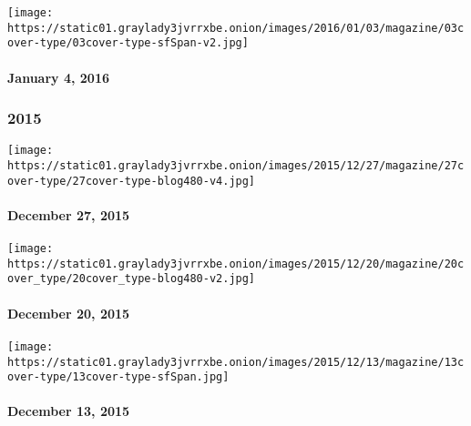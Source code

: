 \href{http://www.nytimes3xbfgragh.onion/indexes/2016/01/04/magazine/index.html}{}

\texttt{[image: https://static01.graylady3jvrrxbe.onion/images/2016/01/03/magazine/03cover-type/03cover-type-sfSpan-v2.jpg]}

\hypertarget{january-4-2016}{%
\paragraph{January 4, 2016}\label{january-4-2016}}

\hypertarget{2015}{%
\subsubsection{2015}\label{2015}}

\href{http://www.nytimes3xbfgragh.onion/indexes/2015/12/27/magazine/index.html}{}

\texttt{[image: https://static01.graylady3jvrrxbe.onion/images/2015/12/27/magazine/27cover-type/27cover-type-blog480-v4.jpg]}

\hypertarget{december-27-2015}{%
\paragraph{December 27, 2015}\label{december-27-2015}}

\href{http://www.nytimes3xbfgragh.onion/indexes/2015/12/20/magazine/index.html}{}

\texttt{[image: https://static01.graylady3jvrrxbe.onion/images/2015/12/20/magazine/20cover\_type/20cover\_type-blog480-v2.jpg]}

\hypertarget{december-20-2015}{%
\paragraph{December 20, 2015}\label{december-20-2015}}

\href{http://www.nytimes3xbfgragh.onion/indexes/2015/12/13/magazine/index.html}{}

\texttt{[image: https://static01.graylady3jvrrxbe.onion/images/2015/12/13/magazine/13cover-type/13cover-type-sfSpan.jpg]}

\hypertarget{december-13-2015}{%
\paragraph{December 13, 2015}\label{december-13-2015}}

\href{http://www.nytimes3xbfgragh.onion/indexes/2015/12/06/magazine/index.html}{}

